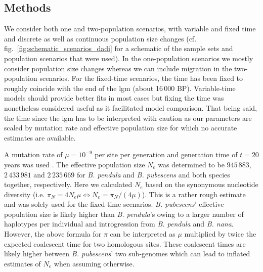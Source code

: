 \documentclass[hidelinks,11pt]{article}
\newcommand{\pendula}{\textit{B. pendula}}
\newcommand{\pubescens}{\textit{B. pubescens}}
\newcommand{\nana}{\textit{B. nana}}
\begin{document}
    \subsection{Methods}

    We consider both one and two-population scenarios, with variable and fixed time and discrete as well as continuous population size changes (cf. fig.~\ref{fig:schematic_scenarios_dadi} for a schematic of the sample sets and population scenarios that were used). In the one-population scenarios we mostly consider population size changes whereas we can include migration in the two-population scenarios. For the fixed-time scenarios, the time has been fixed to roughly coincide with the end of the \acrlong{lgm} (about 16\,000 BP). Variable-time models should provide better fits in most cases but fixing the time was nonetheless considered useful as it facilitated model comparison. That being said, the time since the \acrshort{lgm} has to be interpreted with caution as our parameters are scaled by mutation rate and effective population size for which no accurate estimates are available.

    A mutation rate of $\mu = 10^{-9}$ per site per generation and generation time of $t=20$ years was used \cite{jarkko}. The effective population size $N_e$ was determined to be $945\,883$, $2\,433\,981$ and $2\,235\,669$ for \pendula{} and \pubescens{} and both species together, respectively. Here we calculated $N_e$ based on the synonymous nucleotide diversity (i.e. $\pi_N = 4 N_e \mu \Leftrightarrow N_e = \pi_N/(4\mu)$). This is a rather rough estimate and was solely used for the fixed-time scenarios. \pubescens{}' effective population size is likely higher than \pendula{}'s owing to a larger number of haplotypes per individual and introgression from \pendula{} and \nana{}. However, the above formula for $\pi$ can be interpreted as $\mu$ multiplied by twice the expected coalescent time for two homologous sites. These coalescent times are likely higher between \pubescens{}' two sub-genomes which can lead to inflated estimates of $N_e$ when assuming otherwise.
\end{document}
